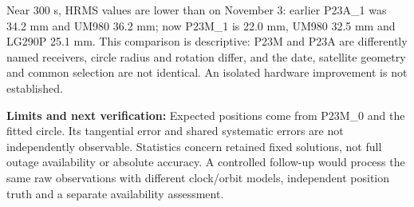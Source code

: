 \documentclass[11pt,a4paper]{article}
\numberwithin{equation}{section}
\numberwithin{figure}{section}
\begin{document}
Near 300 s, HRMS values are lower than on November 3: earlier P23A\_1 was 34.2 mm and UM980 36.2 mm; now P23M\_1 is 22.0 mm, UM980 32.5 mm and LG290P 25.1 mm. This comparison is descriptive: P23M and P23A are differently named receivers, circle radius and rotation differ, and the date, satellite geometry and common selection are not identical. An isolated hardware improvement is not established.

\textbf{Limits and next verification:} Expected positions come from P23M\_0 and the fitted circle. Its tangential error and shared systematic errors are not independently observable. Statistics concern retained fixed solutions, not full outage availability or absolute accuracy. A controlled follow-up would process the same raw observations with different clock/\allowbreak{}orbit models, independent position truth and a separate availability assessment.
\end{document}
